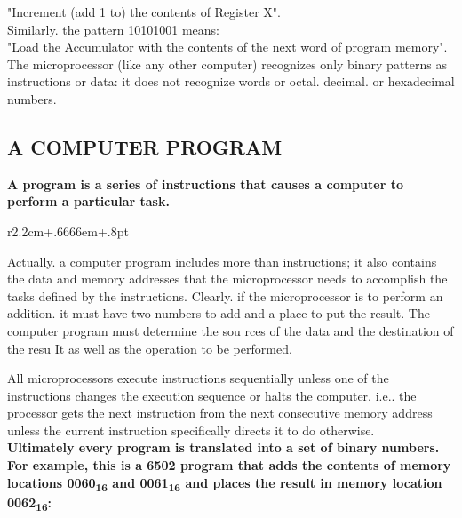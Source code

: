 \documentclass{book}
\begin{document}
"Increment (add 1 to) the contents of Register X".\\

Similarly. the pattern 10101001 means:\\

"Load the Accumulator with the contents of the next word of program memory".\\

The microprocessor (like any other computer) recognizes only binary patterns as instructions or data: it does not recognize words or octal. decimal. or hexadecimal numbers.

\subsection*{A COMPUTER PROGRAM}
\textbf{A program is a series of instructions that causes a computer to perform a particular task.}\\
\begin{wrapfigure}{r}{2.2cm+.6666em+.8pt}
\end{wrapfigure}
Actually. a computer program includes more than instructions; it also contains the data and memory addresses that the microprocessor needs to accomplish the tasks defined by the instructions. Clearly. if the microprocessor is to perform an addition. it must have two numbers to add and a place to put the result. The computer program must determine the sou rces of the data and the destination of the resu It as well as the operation to be performed.

All microprocessors execute instructions sequentially unless one of the instructions changes the execution sequence or halts the computer. i.e.. the processor gets the next instruction from the next consecutive memory address unless the current instruction specifically directs it to do otherwise.\\

\textbf{Ultimately every program is translated into a set of binary numbers. For example, this is a 6502 program that adds the contents of memory locations 0060\textsubscript{16} and 0061\textsubscript{16} and places the result in memory location 0062\textsubscript{16}:}\\
\end{document}
